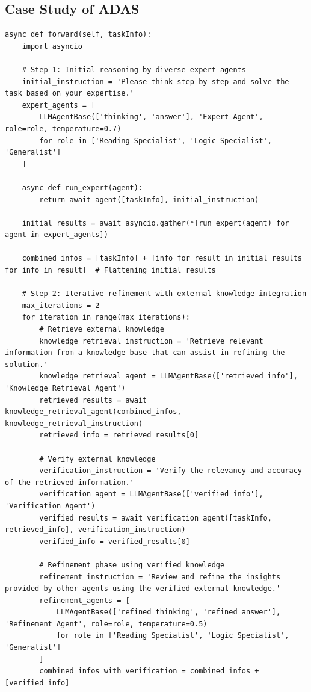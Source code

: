 \subsection{Case Study of ADAS}
\begin{tcolorbox}[title={\textbf{\small Iterative Knowledge-Enhanced Refinement workflow for HotpotQA}}, boxrule=1pt, arc=0mm, colback=black!5!white, colframe=black!75!white, breakable, before skip=10pt, after skip=10pt, pad at break=2mm, parbox=false] \begin{verbatim}
async def forward(self, taskInfo):
    import asyncio

    # Step 1: Initial reasoning by diverse expert agents
    initial_instruction = 'Please think step by step and solve the task based on your expertise.'
    expert_agents = [
        LLMAgentBase(['thinking', 'answer'], 'Expert Agent', role=role, temperature=0.7)
        for role in ['Reading Specialist', 'Logic Specialist', 'Generalist']
    ]

    async def run_expert(agent):
        return await agent([taskInfo], initial_instruction)

    initial_results = await asyncio.gather(*[run_expert(agent) for agent in expert_agents])

    combined_infos = [taskInfo] + [info for result in initial_results for info in result]  # Flattening initial_results

    # Step 2: Iterative refinement with external knowledge integration
    max_iterations = 2
    for iteration in range(max_iterations):
        # Retrieve external knowledge
        knowledge_retrieval_instruction = 'Retrieve relevant information from a knowledge base that can assist in refining the solution.'
        knowledge_retrieval_agent = LLMAgentBase(['retrieved_info'], 'Knowledge Retrieval Agent')
        retrieved_results = await knowledge_retrieval_agent(combined_infos, knowledge_retrieval_instruction)
        retrieved_info = retrieved_results[0]

        # Verify external knowledge
        verification_instruction = 'Verify the relevancy and accuracy of the retrieved information.'
        verification_agent = LLMAgentBase(['verified_info'], 'Verification Agent')
        verified_results = await verification_agent([taskInfo, retrieved_info], verification_instruction)
        verified_info = verified_results[0]

        # Refinement phase using verified knowledge
        refinement_instruction = 'Review and refine the insights provided by other agents using the verified external knowledge.'
        refinement_agents = [
            LLMAgentBase(['refined_thinking', 'refined_answer'], 'Refinement Agent', role=role, temperature=0.5)
            for role in ['Reading Specialist', 'Logic Specialist', 'Generalist']
        ]
        combined_infos_with_verification = combined_infos + [verified_info]
        

\end{verbatim}
\end{tcolorbox}

